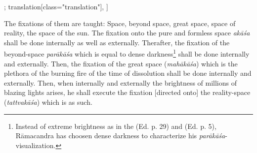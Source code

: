 \begin{alignment}[
  texts=edition[class="edition"];
  translation[class="translation"],
  ]
\begin{translation}
\begin{tlate}
{\begin{quote}
\end{quote}} The fixations of them are taught: Space, beyond space, great space, space of reality, the space of the sun. The fixation onto the pure and formless space \textit{akāśa} shall be done internally as well as externally. Therafter, the fixation of the beyond-space \textit{parākāśa} which is equal to dense darkness\footnote{Instead of extreme brightness as in the  (Ed. p. 29) and  (Ed. p. 5), Rāmacandra has choosen dense darkness to characterize his \textit{parākāśa}-visualization.} shall be done internally and externally. Then, the fixation of the great space (\textit{mahākāśa}) which is the plethora of the burning fire of the time of dissolution shall be done internally and externally. Then, when internally and externally the brightness of millions of blazing lights arises, he shall execute the fixation [directed onto] the reality-space (\textit{tattvakāśa}) which is as such.\end{tlate}
  \end{translation}
\end{alignment}
